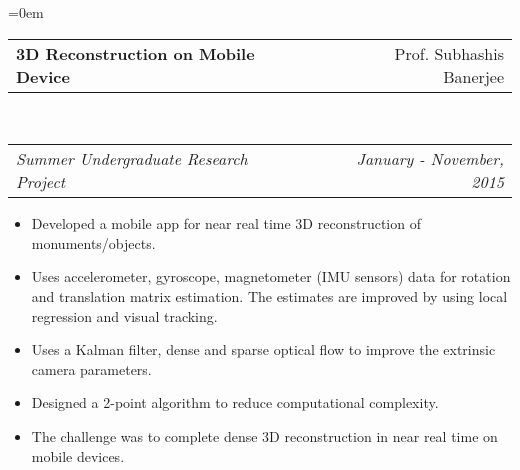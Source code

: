 \documentclass{article}
\makeatletter
\newenvironment{longversion}{}{} %
\newcommand{\headerrow}[2]
{\begin{tabular*}{\linewidth}{l@{\extracolsep{\fill}}r}
	#1 &
	#2 \\
\end{tabular*}}
\makeatother
\begin{document}
\begin{list} {}{\leftmargin=0em}
\item[]
  \headerrow
    {\textbf{3D Reconstruction on Mobile Device}}
    {Prof. Subhashis Banerjee}
  \\
  \headerrow
    {\emph{Summer Undergraduate Research Project}}
    {\emph{January - November, 2015}}
      \begin{itemize}
        \item Developed a mobile app for near real time 3D reconstruction of monuments/objects.
        \item Uses accelerometer, gyroscope, magnetometer (IMU sensors) data for rotation and translation matrix estimation. The estimates are improved by using local regression and visual tracking.
        \item Uses a Kalman filter, dense and sparse optical flow to improve the extrinsic camera parameters. 
        \item Designed a 2-point algorithm to reduce computational complexity. 
        \item The challenge was to complete dense 3D reconstruction in near real time on mobile devices.
      \end{itemize}

\end{list}

\begin{longversion}
\end{longversion}
\end{document}
